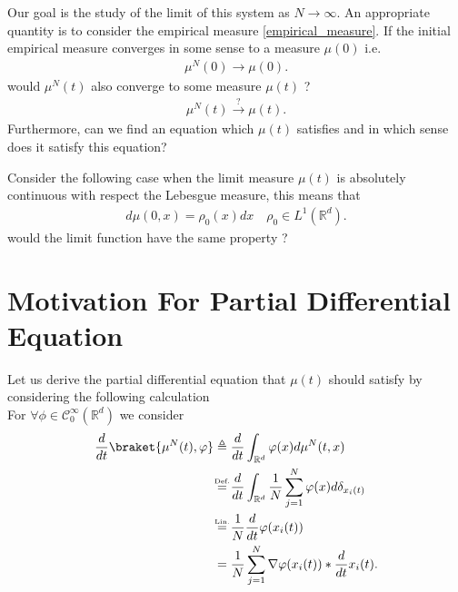 Our goal is the study of the limit of this system as $N \to  \infty$. An appropriate quantity is to consider the empirical measure \ref{empirical_measure}.
If the initial empirical measure converges in some sense to a measure $\mu(0)$ i.e. 
\begin{align*}
  \mu^{N}(0) \to \mu(0)
.\end{align*}
would $\mu^N(t)$ also converge to some measure $\mu(t)$ ?
\begin{align*}
  \mu^N(t) \xrightarrow{?} \mu(t)
.\end{align*}
Furthermore, can we find an equation which $\mu(t)$ satisfies and in which sense does it satisfy this equation?\\[1ex]
\begin{example}
  Consider the following case when the limit measure $\mu(t)$ is absolutely continuous with respect the Lebesgue measure, this means that 
\begin{align*}
  d\mu(0,x) = \rho_0(x) dx \quad \rho_0 \in  L^{1}(\mathbb{R}^{d} ) 
.\end{align*}
would the limit function have the same property ?
\end{example}
\section{Motivation For Partial Differential Equation}
Let us derive the partial differential equation that $\mu(t)$ should satisfy by 
considering the following calculation \\[1ex]
For $\forall \phi  \in  \mathcal{C}_0^{\infty}(\mathbb{R}^{d} ) $ we consider  
\begin{align*}
  \frac{d}{dt} \braket{\mu^N(t),\phi } &\triangleq \frac{d}{dt} \int_{\mathbb{R}^{d} } \phi(x) d\mu^N(t,x)  \\
                                       &\myS{Def.}{=} \frac{d}{dt} \int_{\mathbb{R}^{d} } \frac{1}{N} \sum_{j=1}^{N} \phi(x)d\delta_{x_{i}(t)}\\
                                       &\myS{Lin.}{=} \frac{1}{N} \frac{d}{dt} \phi (x_i(t))\\
                                       &= \frac{1}{N} \sum_{j=1}^{N} \nabla \phi(x_i(t)) *\frac{d}{dt} x_i(t)
.\end{align*}

